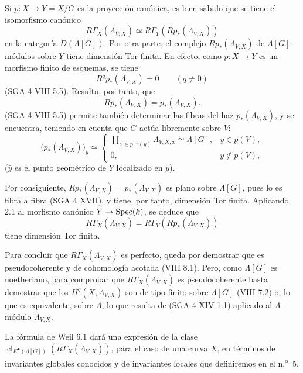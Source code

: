 \begin{prooftext}[Demostración]
Si $p:X\to Y=X/G$ es la proyección canónica, es bien sabido que se tiene el isomorfismo canónico
\[
R\Gamma_X(\Lambda_{V,X})\simeq R\Gamma_Y(Rp_*(\Lambda_{V,X}))
\]
en la categoría $D(\Lambda[G])$. Por otra parte, el complejo $Rp_*(\Lambda_{V,X})$ de $\Lambda[G]$-módulos sobre $Y$ tiene dimensión Tor finita. En efecto, como $p:X\to Y$ es un morfismo finito de esquemas, se tiene
\[
R^q p_*(\Lambda_{V,X})=0\qquad(q\ne0)
\]
(SGA 4 VIII 5.5). Resulta, por tanto, que
\[
Rp_*(\Lambda_{V,X})=p_*(\Lambda_{V,X}).
\]
(SGA 4 VIII 5.5) permite también determinar las fibras del haz $p_*(\Lambda_{V,X})$, y se encuentra, teniendo en cuenta que $G$ actúa libremente sobre $V$:
\[
\bigl(p_*(\Lambda_{V,X})\bigr)_{\bar y}\simeq
\begin{cases}
\displaystyle \prod_{x\in p^{-1}(y)}\Lambda_{V,X,\bar x}\simeq \Lambda[G],& y\in p(V),\\[1em]
0,& y\notin p(V),
\end{cases}
\]
($\bar y$ es el punto geométrico de $Y$ localizado en $y$).

Por consiguiente, $Rp_*(\Lambda_{V,X})=p_*(\Lambda_{V,X})$ es plano sobre $\Lambda[G]$, pues lo es fibra a fibra (SGA 4 XVII), y tiene, por tanto, dimensión Tor finita. Aplicando 2.1 al morfismo canónico $Y\to\operatorname{Spec}(k)$, se deduce que
\[
R\Gamma_X(\Lambda_{V,X})=R\Gamma_Y(Rp_*(\Lambda_{V,X}))
\]
tiene dimensión Tor finita.

Para concluir que $R\Gamma_X(\Lambda_{V,X})$ es perfecto, queda por demostrar que es pseudocoherente y de cohomología acotada (VIII 8.1). Pero, como $\Lambda[G]$ es noetheriano, para comprobar que $R\Gamma_X(\Lambda_{V,X})$ es pseudocoherente basta demostrar que los $H^q(X,\Lambda_{V,X})$ son de tipo finito sobre $\Lambda[G]$ (VIII 7.2) o, lo que es equivalente, sobre $\Lambda$, lo que resulta de (SGA 4 XIV 1.1) aplicado al $\Lambda$-módulo $\Lambda_{V,X}$.
\end{prooftext}

La fórmula de Weil 6.1 dará una expresión de la clase $\operatorname{cl}_{K^\bullet(\Lambda[G])}(R\Gamma_X(\Lambda_{V,X}))$, para el caso de una curva $X$, en términos de invariantes globales conocidos y de invariantes locales que definiremos en el n.\textsuperscript{o}~5.
